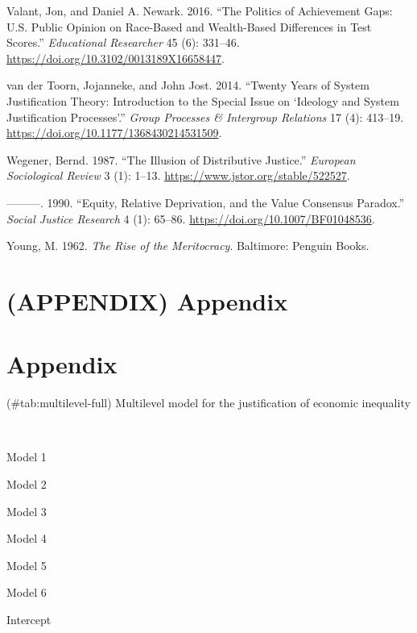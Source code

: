 \documentclass[
]{article}
\newlength{\cslhangindent}
\newenvironment{CSLReferences}[2] %
 {\begin{list}{}{%
  \setlength{\itemindent}{0pt}
  \setlength{\leftmargin}{0pt}
  \setlength{\parsep}{0pt}
  \ifodd #1
   \setlength{\leftmargin}{\cslhangindent}
   \setlength{\itemindent}{-1\cslhangindent}
  \fi
  \setlength{\itemsep}{#2\baselineskip}}}
 {\end{list}}
\begin{document}
\begin{CSLReferences}{1}{0}
Valant, Jon, and Daniel A. Newark. 2016. {``The {Politics} of
{Achievement Gaps}: {U}.{S}. {Public Opinion} on {Race-Based} and
{Wealth-Based Differences} in {Test Scores}.''} \emph{Educational
Researcher} 45 (6): 331--46.
\url{https://doi.org/10.3102/0013189X16658447}.

van der Toorn, Jojanneke, and John Jost. 2014. {``Twenty Years of System
Justification Theory: {Introduction} to the Special Issue on
{`{Ideology} and System Justification Processes'}.''} \emph{Group
Processes \& Intergroup Relations} 17 (4): 413--19.
\url{https://doi.org/10.1177/1368430214531509}.

Wegener, Bernd. 1987. {``The {Illusion} of {Distributive Justice}.''}
\emph{European Sociological Review} 3 (1): 1--13.
\url{https://www.jstor.org/stable/522527}.

---------. 1990. {``Equity, Relative Deprivation, and the Value
Consensus Paradox.''} \emph{Social Justice Research} 4 (1): 65--86.
\url{https://doi.org/10.1007/BF01048536}.

Young, M. 1962. \emph{The Rise of the Meritocracy}. Baltimore: Penguin
Books.

\end{CSLReferences}

\section*{(APPENDIX) Appendix}\label{appendix-appendix}

\appendix \section{Appendix}

(\#tab:multilevel-full) Multilevel model for the justification of
economic inequality

~

Model 1

Model 2

Model 3

Model 4

Model 5

Model 6

Intercept
\end{document}
